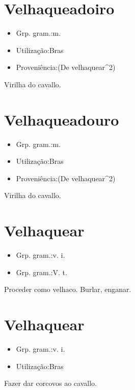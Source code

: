 \documentclass{article}
\begin{document}
\section{Velhaqueadoiro}
\begin{itemize}
\item {Grp. gram.:m.}
\end{itemize}
\begin{itemize}
\item {Utilização:Bras}
\end{itemize}
\begin{itemize}
\item {Proveniência:(De \textunderscore velhaquear\textunderscore ^2)}
\end{itemize}
Virilha do cavallo.
\section{Velhaqueadouro}
\begin{itemize}
\item {Grp. gram.:m.}
\end{itemize}
\begin{itemize}
\item {Utilização:Bras}
\end{itemize}
\begin{itemize}
\item {Proveniência:(De \textunderscore velhaquear\textunderscore ^2)}
\end{itemize}
Virilha do cavallo.
\section{Velhaquear}
\begin{itemize}
\item {Grp. gram.:v. i.}
\end{itemize}
\begin{itemize}
\item {Grp. gram.:V. t.}
\end{itemize}
Proceder como velhaco.
Burlar, enganar.
\section{Velhaquear}
\begin{itemize}
\item {Grp. gram.:v. i.}
\end{itemize}
\begin{itemize}
\item {Utilização:Bras}
\end{itemize}
Fazer dar corcovos ao cavallo.
\end{document}
